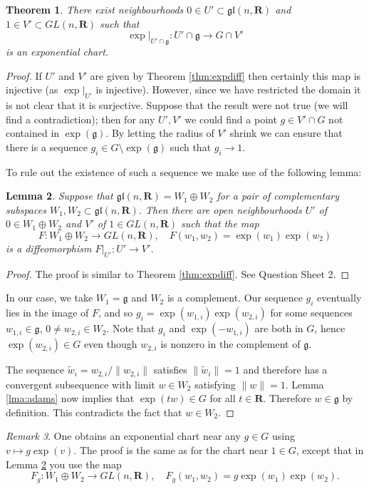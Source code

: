 \documentclass[12pt]{article}
\newcommand{\RR}{\mathbf{R}}
\newtheorem{thm}{Theorem}[section]
\newtheorem{lma}[thm]{Lemma}
\theoremstyle{definition}
\theoremstyle{check}
\theoremstyle{remark}
\newtheorem{rmk}[thm]{Remark}
\theoremstyle{TheoremNum}
\begin{document}
\begin{thm}
There exist neighbourhoods $0\in U'\subset\mathfrak{gl}(n,\RR)$ and $1\in V'\subset GL(n,\RR)$ such that
\[\exp|_{U'\cap\mathfrak{g}}\colon U'\cap\mathfrak{g}\to G\cap V'\]
is an exponential chart.
\end{thm}
\begin{proof}
If $U'$ and $V'$ are given by Theorem \ref{thm:expdiff} then certainly this map is injective (as $\exp|_{U'}$ is injective). However, since we have restricted the domain it is not clear that it is surjective. Suppose that the result were not true (we will find a contradiction); then for any $U',V'$ we could find a point $g\in V'\cap G$ not contained in $\exp(\mathfrak{g})$. By letting the radius of $V'$ shrink we can ensure that there is a sequence $g_i\in G\setminus\exp(\mathfrak{g})$ such that $g_i\to 1$.

To rule out the existence of such a sequence we make use of the following lemma:

\begin{lma}\label{lma:complsubsp}
Suppose that $\mathfrak{gl}(n,\RR)=W_1\oplus W_2$ for a pair of complementary subspaces $W_1,W_2\subset\mathfrak{gl}(n,\RR)$. Then there are open neighbourhoods $U'$ of $0\in W_1\oplus W_2$ and $V'$ of $1\in GL(n,\RR)$ such that the map
\[F\colon W_1\oplus W_2\to GL(n,\RR),\quad F(w_1,w_2)=\exp(w_1)\exp(w_2)\]
is a diffeomorphism $F|_{U'}\colon U'\to V'$.
\end{lma}
\begin{proof}
The proof is similar to Theorem \ref{thm:expdiff}. See Question Sheet 2.
\end{proof}

In our case, we take $W_1=\mathfrak{g}$ and $W_2$ is a complement. Our sequence $g_i$ eventually lies in the image of $F$, and so $g_i=\exp(w_{1,i})\exp(w_{2,i})$ for some sequences $w_{1,i}\in\mathfrak{g}$, $0\neq w_{2,i}\in W_2$. Note that $g_i$ and $\exp(-w_{1,i})$ are both in $G$, hence $\exp(w_{2,i})\in G$ even though $w_{2,i}$ is nonzero in the complement of $\mathfrak{g}$.

The sequence $\tilde{w}_i=w_{2,i}/\|w_{2,i}\|$ satisfies $\|\tilde{w}_i\|=1$ and therefore has a convergent subsequence with limit $w\in W_2$ satisfying $\|w\|=1$. Lemma \ref{lma:adams} now implies that $\exp(tw)\in G$ for all $t\in\RR$. Therefore $w\in\mathfrak{g}$ by definition. This contradicts the fact that $w\in W_2$.
\end{proof}

\begin{rmk}
One obtains an exponential chart near any $g\in G$ using $v\mapsto g\exp(v)$. The proof is the same as for the chart near $1\in G$, except that in Lemma \ref{lma:complsubsp} you use the map
\[F_g\colon W_1\oplus W_2\to GL(n,\RR),\quad F_g(w_1,w_2)=g\exp(w_1)\exp(w_2).\]
\end{rmk}
\end{document}
